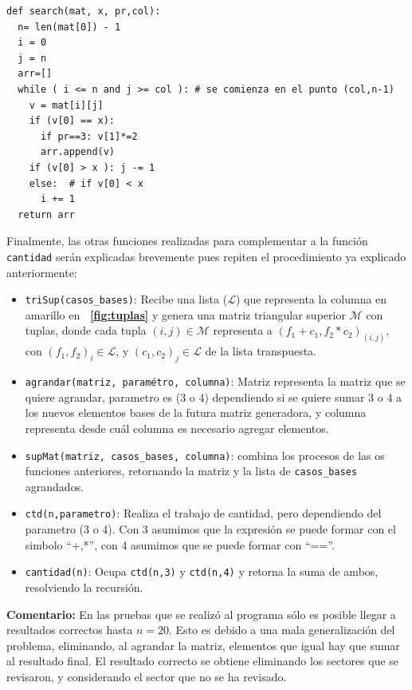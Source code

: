 \documentclass[letterpaper,10pt,table, dvipsnames]{article}
\newenvironment{code}{\captionsetup{type=listing}}{}
\newcommand{\figref}[1]{\figurename~\ref{#1}}
\begin{document}
\begin{code}
\label{code:search}
\begin{verbatim}
def search(mat, x, pr,col):
  n= len(mat[0]) - 1
  i = 0 
  j = n
  arr=[] 
  while ( i <= n and j >= col ): # se comienza en el punto (col,n-1)
    v = mat[i][j]
    if (v[0] == x):
      if pr==3: v[1]*=2
      arr.append(v)
    if (v[0] > x ): j -= 1 
    else:  # if v[0] < x
      i += 1
  return arr
\end{verbatim}
\end{code}

Finalmente, las otras funciones realizadas para complementar a la función \texttt{cantidad} serán explicadas brevemente pues repiten el procedimiento ya explicado anteriormente:
\begin{itemize}
  \item \texttt{triSup(casos\_bases)}: Recibe una lista ($\mathcal{L} $) que representa la columna en amarillo en \textbf{\figref{fig:tuplas}} y genera una matriz triangular superior $\mathcal{M} $ con tuplas, donde cada tupla $(i,j) \in \mathcal{M} $ representa a $(f_1 + c_1, f_2 * c_2)_(i,j)$, con $(f_1,f_2)_i \in \mathcal{L}$, y $(c_1,c_2)_j \in \mathcal{L}$ de la lista transpuesta.
  \item \texttt{agrandar(matriz, paramétro, columna)}: Matriz representa la matriz que se quiere agrandar, parametro es (3 o 4) dependiendo si se quiere sumar 3 o 4 a los nuevos elementos bases de la futura matriz generadora, y columna representa desde cuál columna es necesario agregar elementos.
  \item \texttt{supMat(matriz, casos\_bases, columna)}: combina los procesos de las os funciones anteriores, retornando la matriz y la lista de \texttt{casos\_bases} agrandados.
  \item \texttt{ctd(n,parametro)}: Realiza el trabajo de cantidad, pero dependiendo del parametro (3 o 4). Con 3 asumimos que la expresión se puede formar con el simbolo ``+,*'', con 4 asumimos que se puede formar con ``==''.
  \item \texttt{cantidad(n)}: Ocupa \texttt{ctd(n,3)} y \texttt{ctd(n,4)} y retorna la suma de ambos, resolviendo la recursión.
\end{itemize}

\textbf{Comentario: } En las pruebas que se realizó al programa sólo es posible llegar a resultados correctos hasta $n=20$. Esto es debido a una mala generalización del problema, eliminando, al agrandar la matriz, elementos que igual hay que sumar al resultado final. El resultado correcto se obtiene eliminando los sectores que se revisaron, y considerando el sector que no se ha revisado. 
\end{document}
